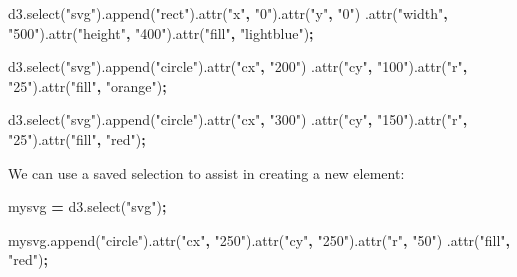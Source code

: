 \documentclass[openany]{book}
\newenvironment{Shaded}{\begin{snugshade}}{\end{snugshade}}
\newcommand{\AttributeTok}[1]{\textcolor[rgb]{0.77,0.63,0.00}{#1}}
\newcommand{\NormalTok}[1]{#1}
\newcommand{\OperatorTok}[1]{\textcolor[rgb]{0.81,0.36,0.00}{\textbf{#1}}}
\newcommand{\StringTok}[1]{\textcolor[rgb]{0.31,0.60,0.02}{#1}}
\newcommand{\VariableTok}[1]{\textcolor[rgb]{0.00,0.00,0.00}{#1}}
\begin{document}
\begin{Shaded}
\begin{Highlighting}[]
\VariableTok{d3}\NormalTok{.}\AttributeTok{select}\NormalTok{(}\StringTok{"svg"}\NormalTok{).}\AttributeTok{append}\NormalTok{(}\StringTok{"rect"}\NormalTok{).}\AttributeTok{attr}\NormalTok{(}\StringTok{"x"}\OperatorTok{,} \StringTok{"0"}\NormalTok{).}\AttributeTok{attr}\NormalTok{(}\StringTok{"y"}\OperatorTok{,} \StringTok{"0"}\NormalTok{)}
\NormalTok{    .}\AttributeTok{attr}\NormalTok{(}\StringTok{"width"}\OperatorTok{,} \StringTok{"500"}\NormalTok{).}\AttributeTok{attr}\NormalTok{(}\StringTok{"height"}\OperatorTok{,} \StringTok{"400"}\NormalTok{).}\AttributeTok{attr}\NormalTok{(}\StringTok{"fill"}\OperatorTok{,} \StringTok{"lightblue"}\NormalTok{)}\OperatorTok{;}
    
\VariableTok{d3}\NormalTok{.}\AttributeTok{select}\NormalTok{(}\StringTok{"svg"}\NormalTok{).}\AttributeTok{append}\NormalTok{(}\StringTok{"circle"}\NormalTok{).}\AttributeTok{attr}\NormalTok{(}\StringTok{"cx"}\OperatorTok{,} \StringTok{"200"}\NormalTok{)}
\NormalTok{    .}\AttributeTok{attr}\NormalTok{(}\StringTok{"cy"}\OperatorTok{,} \StringTok{"100"}\NormalTok{).}\AttributeTok{attr}\NormalTok{(}\StringTok{"r"}\OperatorTok{,} \StringTok{"25"}\NormalTok{).}\AttributeTok{attr}\NormalTok{(}\StringTok{"fill"}\OperatorTok{,} \StringTok{"orange"}\NormalTok{)}\OperatorTok{;}
    
\VariableTok{d3}\NormalTok{.}\AttributeTok{select}\NormalTok{(}\StringTok{"svg"}\NormalTok{).}\AttributeTok{append}\NormalTok{(}\StringTok{"circle"}\NormalTok{).}\AttributeTok{attr}\NormalTok{(}\StringTok{"cx"}\OperatorTok{,} \StringTok{"300"}\NormalTok{)}
\NormalTok{    .}\AttributeTok{attr}\NormalTok{(}\StringTok{"cy"}\OperatorTok{,} \StringTok{"150"}\NormalTok{).}\AttributeTok{attr}\NormalTok{(}\StringTok{"r"}\OperatorTok{,} \StringTok{"25"}\NormalTok{).}\AttributeTok{attr}\NormalTok{(}\StringTok{"fill"}\OperatorTok{,} \StringTok{"red"}\NormalTok{)}\OperatorTok{;}  
\end{Highlighting}
\end{Shaded}

We can use a saved selection to assist in creating a new element:

\begin{Shaded}
\begin{Highlighting}[]
\NormalTok{mysvg }\OperatorTok{=} \VariableTok{d3}\NormalTok{.}\AttributeTok{select}\NormalTok{(}\StringTok{"svg"}\NormalTok{)}\OperatorTok{;}

\VariableTok{mysvg}\NormalTok{.}\AttributeTok{append}\NormalTok{(}\StringTok{"circle"}\NormalTok{).}\AttributeTok{attr}\NormalTok{(}\StringTok{"cx"}\OperatorTok{,} \StringTok{"250"}\NormalTok{).}\AttributeTok{attr}\NormalTok{(}\StringTok{"cy"}\OperatorTok{,} \StringTok{"250"}\NormalTok{).}\AttributeTok{attr}\NormalTok{(}\StringTok{"r"}\OperatorTok{,} \StringTok{"50"}\NormalTok{)}
\NormalTok{  .}\AttributeTok{attr}\NormalTok{(}\StringTok{"fill"}\OperatorTok{,} \StringTok{"red"}\NormalTok{)}\OperatorTok{;}
\end{Highlighting}
\end{Shaded}
\end{document}
